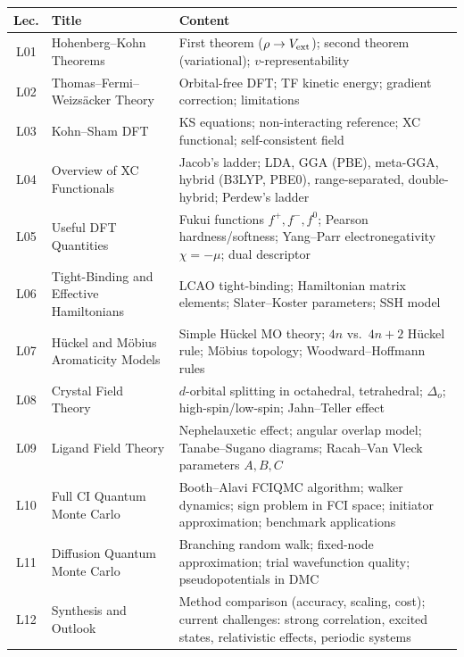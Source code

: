 \documentclass[11pt,a4paper]{article}
\begin{document}
\begin{tcolorbox}[chembox, title={Module~III.3 --- Lecture Overview (DFT, Effective Models, and Special Methods)}]
\begin{longtable}{clp{7.2cm}}
\toprule
\textbf{Lec.} & \textbf{Title} & \textbf{Content}\\
\midrule
\endhead
L01 & Hohenberg--Kohn Theorems &
      First theorem ($\rho\to V_{\rm ext}$);
      second theorem (variational); $v$-representability\\
L02 & Thomas--Fermi--Weizs\"acker Theory &
      Orbital-free DFT; TF kinetic energy;
      gradient correction; limitations\\
L03 & Kohn--Sham DFT &
      KS equations; non-interacting reference;
      XC functional; self-consistent field\\
L04 & Overview of XC Functionals &
      Jacob's ladder; LDA, GGA (PBE), meta-GGA,
      hybrid (B3LYP, PBE0), range-separated, double-hybrid; Perdew's ladder\\
L05 & Useful DFT Quantities &
      Fukui functions $f^+,f^-,f^0$;
      Pearson hardness/softness;
      Yang--Parr electronegativity $\chi=-\mu$; dual descriptor\\
L06 & Tight-Binding and Effective Hamiltonians &
      LCAO tight-binding; Hamiltonian matrix elements;
      Slater--Koster parameters; SSH model\\
L07 & H\"uckel and M\"obius Aromaticity Models &
      Simple H\"uckel MO theory;
      $4n$ vs.\ $4n+2$ H\"uckel rule;
      M\"obius topology; Woodward--Hoffmann rules\\
L08 & Crystal Field Theory &
      $d$-orbital splitting in octahedral, tetrahedral;
      $\Delta_o$; high-spin/low-spin; Jahn--Teller effect\\
L09 & Ligand Field Theory &
      Nephelauxetic effect; angular overlap model;
      Tanabe--Sugano diagrams;
      Racah--Van Vleck parameters $A,B,C$\\
L10 & Full CI Quantum Monte Carlo &
      Booth--Alavi FCIQMC algorithm;
      walker dynamics; sign problem in FCI space;
      initiator approximation; benchmark applications\\
L11 & Diffusion Quantum Monte Carlo &
      Branching random walk; fixed-node approximation;
      trial wavefunction quality; pseudopotentials in DMC\\
L12 & Synthesis and Outlook &
      Method comparison (accuracy, scaling, cost);
      current challenges: strong correlation,
      excited states, relativistic effects, periodic systems\\
\bottomrule
\end{longtable}
\end{tcolorbox}
\end{document}

